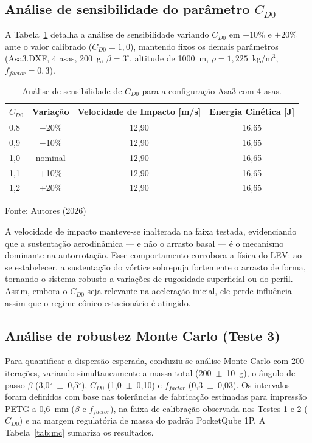 \subsection{Análise de sensibilidade do parâmetro $C_{D0}$}

A Tabela~\ref{tab:cd0} detalha a análise de sensibilidade variando $C_{D0}$ em $\pm10\%$ e $\pm20\%$ ante o valor calibrado ($C_{D0}=1,0$), mantendo fixos os demais parâmetros (Asa3.DXF, 4 asas, 200~g, $\beta=3^\circ$, altitude de 1000~m, $\rho=1,225$~kg/m$^3$, $f_{factor}=0,3$).

\begin{table}[htbp]
\caption{Análise de sensibilidade de $C_{D0}$ para a configuração Asa3 com 4 asas.}
\centering
\begin{tabular*}{\textwidth}{@{\extracolsep{\fill}}lccc}
\hline
$C_{D0}$ & Variação & Velocidade de Impacto [m/s] & Energia Cinética [J] \\
\hline
0,8 & $-$20\% & 12,90 & 16,65 \\
0,9 & $-$10\% & 12,90 & 16,65 \\
1,0 & nominal & 12,90 & 16,65 \\
1,1 & +10\% & 12,90 & 16,65 \\
1,2 & +20\% & 12,90 & 16,65 \\
\hline
\end{tabular*}
{\footnotesize\centering Fonte: Autores (2026)\par}
\label{tab:cd0}
\end{table}

A velocidade de impacto manteve-se inalterada na faixa testada, evidenciando que a sustentação aerodinâmica — e não o arrasto basal — é o mecanismo dominante na autorrotação. Esse comportamento corrobora a física do LEV: ao se estabelecer, a sustentação do vórtice sobrepuja fortemente o arrasto de forma, tornando o sistema robusto a variações de rugosidade superficial ou do perfil. Assim, embora o $C_{D0}$ seja relevante na aceleração inicial, ele perde influência assim que o regime cônico-estacionário é atingido.

\subsection{Análise de robustez Monte Carlo (Teste 3)}

Para quantificar a dispersão esperada, conduziu-se análise Monte Carlo com 200 iterações, variando simultaneamente a massa total (200~$\pm$~10~g), o ângulo de passo $\beta$ (3,0$^\circ$~$\pm$~0,5$^\circ$), $C_{D0}$ (1,0~$\pm$~0,10) e $f_{factor}$ (0,3~$\pm$~0,03). Os intervalos foram definidos com base nas tolerâncias de fabricação estimadas para impressão PETG a 0,6~mm ($\beta$ e $f_{factor}$), na faixa de calibração observada nos Testes 1 e 2 ($C_{D0}$) e na margem regulatória de massa do padrão PocketQube 1P. A Tabela~\ref{tab:mc} sumariza os resultados.


